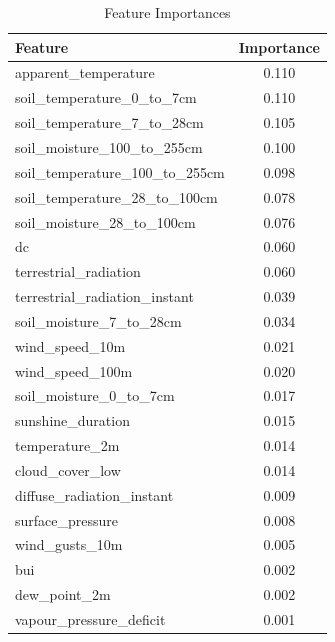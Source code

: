 \begin{table}[H]
	\caption{Feature Importances}
	\centering
	\label{feature_importances}
	\begin{tabular}{lc}
		\hline
		Feature                                & Importance \\ \hline
		apparent\_temperature                 & 0.110       \\ 
		soil\_temperature\_0\_to\_7cm           & 0.110       \\ 
		soil\_temperature\_7\_to\_28cm          & 0.105       \\ 
		soil\_moisture\_100\_to\_255cm         & 0.100       \\ 
		soil\_temperature\_100\_to\_255cm      & 0.098       \\ 
		soil\_temperature\_28\_to\_100cm        & 0.078       \\ 
		soil\_moisture\_28\_to\_100cm          & 0.076       \\ 
		dc                                         & 0.060       \\ 
		terrestrial\_radiation                   & 0.060       \\ 
		terrestrial\_radiation\_instant           & 0.039       \\ 
		soil\_moisture\_7\_to\_28cm             & 0.034       \\ 
		wind\_speed\_10m                        & 0.021       \\ 
		wind\_speed\_100m                       & 0.020       \\ 
		soil\_moisture\_0\_to\_7cm               & 0.017       \\ 
		sunshine\_duration                      & 0.015       \\ 
		temperature\_2m                         & 0.014       \\ 
		cloud\_cover\_low                       & 0.014       \\ 
		diffuse\_radiation\_instant             & 0.009       \\ 
		surface\_pressure                       & 0.008       \\ 
		wind\_gusts\_10m                        & 0.005       \\ 
		bui                                        & 0.002       \\ 
		dew\_point\_2m                          & 0.002       \\ 
		vapour\_pressure\_deficit               & 0.001       \\ 

\end{tabular}
\end{table}

